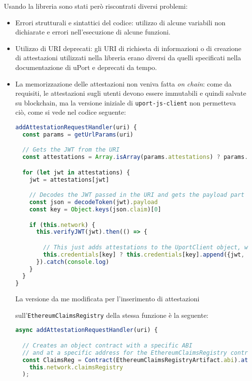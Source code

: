 Usando la libreria sono stati però riscontrati diversi problemi:

\begin{itemize}
  \item Errori strutturali e sintattici del codice: utilizzo di alcune variabili non dichiarate
  e errori nell'esecuzione di alcune funzioni.
  \item Utilizzo di URI deprecati: gli URI di richiesta di informazioni o di creazione di attestazioni utilizzati nella libreria erano
  diversi da quelli specificati nella documentazione di uPort e deprecati da tempo.
  \item La memorizzazione delle attestazioni non veniva fatta \emph{on chain}: 
  come da requisiti, le attestazioni sugli utenti devono essere immutabili e quindi salvate su blockchain, ma la versione iniziale di
  \texttt{uport-js-client} non permetteva ciò, come si vede nel codice seguente:

  \begin{lstlisting}[language=JavaScript]
addAttestationRequestHandler(uri) {
  const params = getUrlParams(uri)

  // Gets the JWT from the URI
  const attestations = Array.isArray(params.attestations) ? params.attestations : [params.attestations]

  for (let jwt in attestations) {
    jwt = attestations[jwt]

    // Decodes the JWT passed in the URI and gets the payload part
    const json = decodeToken(jwt).payload
    const key = Object.keys(json.claim)[0]

    if (this.network) {
      this.verifyJWT(jwt).then(() => {

        // This just adds attestations to the UportClient object, while we want attestations to be stored on the blockchain
        this.credentials[key] ? this.credentials[key].append({jwt, json}) : this.credentials[key] = [{jwt, json}]
      }).catch(console.log)
    }
  }
}
  \end{lstlisting}

  La versione da me modificata per l'inserimento di attestazioni 
  
  sull'\texttt{EthereumClaimsRegistry} della stessa funzione è la seguente: 

  \begin{lstlisting}[language=JavaScript]
async addAttestationRequestHandler(uri) {

  // Creates an object contract with a specific ABI 
  // and at a specific address for the EthereumClaimsRegistry contract
  const ClaimsReg = Contract(EthereumClaimsRegistryArtifact.abi).at(
    this.network.claimsRegistry
  );


\end{lstlisting}
\end{itemize}
